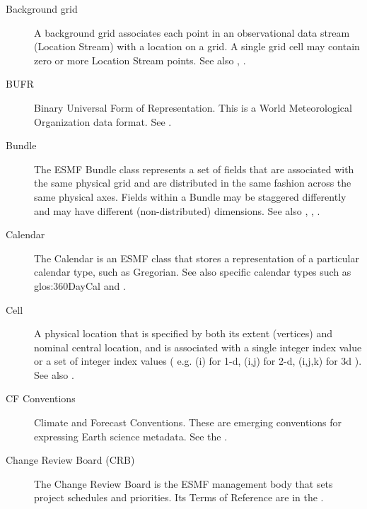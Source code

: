 \begin{description}
\label{glos:BackGrid}
\item[Background grid] 
  A background grid associates each point in an observational data stream 
  (Location Stream) with a location on a grid. A single grid cell may contain 
  zero or more Location Stream points. See also , . 

\label{glos:BUFR}
\item[BUFR]
  Binary Universal Form of Representation.  This is a World Meteorological Organization
data format.  See .

\label{glos:Bundle}
\item[Bundle] The ESMF Bundle class represents a set of fields that 
  are associated with the same physical grid and are distributed in 
  the same fashion across the same physical axes.  Fields within a
  Bundle may be staggered differently and may have different (non-distributed)
  dimensions.  See also , ,
  . 

\label{glos:Calendar}
\item[Calendar] The Calendar is an ESMF class that 
  stores a representation of a particular calendar type, such as Gregorian.
  See also specific calendar types such as 
  {glos:360DayCal} and .

\label{glos:Cell}
\item[Cell] A physical location that is specified by both 
  its extent (vertices) and nominal central location, and is associated with 
  a single integer index value or a set of integer index values ( e.g.
  (i) for 1-d, (i,j) for 2-d, (i,j,k) for 3d ). 
  See also .

\label{glos:CF}
\item[CF Conventions]
Climate and Forecast Conventions.  These are emerging conventions for expressing 
Earth science metadata.  See the .

\label{glos:CRB}
\item[Change Review Board (CRB)] The Change Review Board is the ESMF management
body that sets project schedules and priorities.  Its Terms of Reference
are in the .


\end{description}
